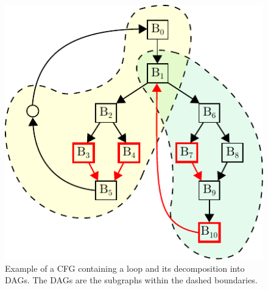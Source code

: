 \begin{figure}[t]
  \centering
  \includegraphics[scale=0.75]{figs/cfg-relax-example.pdf}
  \caption{Example of a CFG containing a loop and its decomposition into DAGs.
           The DAGs are the subgraphs within the dashed boundaries.}
  \label{fig:cfg-relax-example}
\end{figure}

